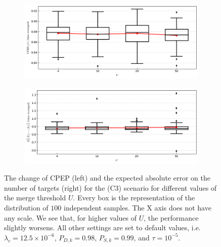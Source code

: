 \begin{figure}
    \centering
    \begin{subfigure}[]{0.48\linewidth}
        \centering
        \includegraphics[width=\linewidth]{figures/c3-u-cpep.png}
    \end{subfigure}
    \hfill
    \begin{subfigure}[]{0.48\linewidth}
        \centering
        \includegraphics[width=\linewidth]{figures/c3-u-eae.png}
    \end{subfigure}
  \caption[(C3). Change of performance depending on the merge threshold.]{The change of CPEP (left) and the expected absolute error on the number of targets (right) for the (C3) scenario for different values of the merge threshold $U$. Every box is the representation of the distribution of $100$ independent samples. The X axis does not have any scale. We see that, for higher values of $U$, the performance slightly worsens. All other settings are set to default values, i.e. $\lambda_{c} = 12.5 \times 10^{-6}$, $P_{D,k} = 0.98$, $P_{S,k} = 0.99$, and $\tau = 10^{-5}$.}
  \label{fig:c3-u}
\end{figure}

